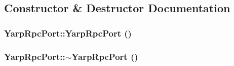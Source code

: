 \subsection{Constructor \& Destructor Documentation}
\hypertarget{class_robot_model_1_1_yarp_rpc_port_a393b44f37d77b25d8c5cb7f14609c4d5}{
\subsubsection[{YarpRpcPort}]{\setlength{\rightskip}{0pt plus 5cm}YarpRpcPort::YarpRpcPort ()}}
\label{class_robot_model_1_1_yarp_rpc_port_a393b44f37d77b25d8c5cb7f14609c4d5}
\hypertarget{class_robot_model_1_1_yarp_rpc_port_acf21bbb8e38b69fd9c3769a2f9b45743}{
\subsubsection[{$\sim$YarpRpcPort}]{\setlength{\rightskip}{0pt plus 5cm}YarpRpcPort::$\sim$YarpRpcPort ()}}
\label{class_robot_model_1_1_yarp_rpc_port_acf21bbb8e38b69fd9c3769a2f9b45743}


